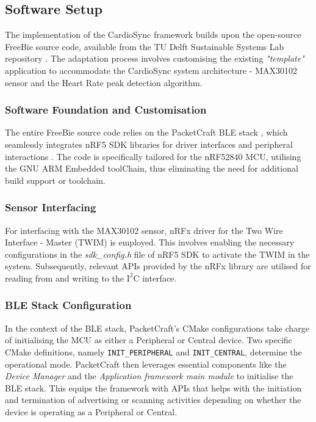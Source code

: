 \subsection{Software Setup}
\label{sec:software_setup_impl}
The implementation of the CardioSync framework builds upon the open-source FreeBie source code, available from the TU Delft Sustainable Systems Lab repository \cite{FreebieGithub}. The adaptation process involves customising the existing \textit{"template"} application to accommodate the CardioSync system architecture  - MAX30102 sensor and the Heart Rate peak detection algorithm.

\subsubsection{Software Foundation and Customisation}

The entire FreeBie source code relies on the PacketCraft BLE stack \cite{2020Packetcraft}, which seamlessly integrates nRF5 SDK libraries for driver interfaces and peripheral interactions \cite{2023nRF5}. The code is specifically tailored for the nRF52840 MCU, utilising the GNU ARM Embedded toolChain, thus eliminating the need for additional build support or toolchain.

\subsubsection{Sensor Interfacing}

For interfacing with the MAX30102 sensor, nRFx driver for the Two Wire Interface - Master (TWIM) is employed. This involves enabling the necessary configurations in the \textit{sdk\_config.h} file of nRF5 SDK to activate the TWIM in the system. Subsequently, relevant APIs provided by the nRFx library are utilised for reading from and writing to the \(\text{I}^2\text{C}\) interface.
 
\subsubsection{BLE Stack Configuration}

In the context of the BLE stack, PacketCraft's CMake configurations take charge of initialising the MCU as either a Peripheral or Central device. Two specific CMake definitions, namely \texttt{INIT\_PERIPHERAL} and \texttt{INIT\_CENTRAL}, determine the operational mode. PacketCraft then leverages essential components like the \textit{Device Manager} and the \textit{Application framework main module} to initialise the BLE stack. This equips the framework with APIs that helps with the initiation and termination of advertising or scanning activities depending on whether the device is operating as a Peripheral or Central.

